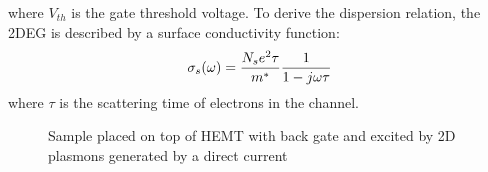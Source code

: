\documentclass[11pt]{article}
\begin{document}
%
where $V_{th}$ is the gate threshold voltage. To derive the dispersion relation, the 2DEG is described by a surface conductivity function:
%
\begin{equation}
  \sigma_s(\omega) = \frac{N_s e^2 \tau}{m^{\ast}}\frac{1}{1 - j \omega \tau}
  \label{eq:conductivity}
\end{equation}
%
where $\tau$ is the scattering time of electrons in the channel.
\begin{figure}[t!]
  \centering
  \def\svgwidth{.75\linewidth}
  
  \caption{Sample placed on top of HEMT with back gate and excited by 2D plasmons generated by a direct current}
  \label{fig:struct}
\end{figure}
%










\clearpage %
% 


\end{document}
